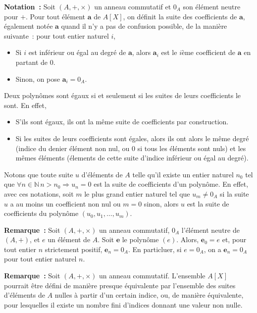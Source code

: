 \medskip

\noindent\textbf{Notation :} 
    Soit $(A, +, \times)$ un anneau commutatif et $0_A$ son élément neutre pour $+$.
    Pour tout élément $\mathbf{a}$ de $A[X]$, on définit la suite des coefficients de $\mathbf{a}$, également notée $\mathbf{a}$ quand il n'y a pas de confusion possible, de la manière suivante : pour tout entier naturel $i$, 
\begin{itemize}[nosep]
    \item Si $i$ est inférieur ou égal au degré de $\mathbf{a}$, alors $\mathbf{a}_i$ est le $i$ème coefficient de $\mathbf{a}$ en partant de $0$.
    \item Sinon, on pose $\mathbf{a}_i = 0_A$.
\end{itemize}
Deux polynômes sont égaux si et seulement si les suites de leurs coefficients le sont.
En effet, 
\begin{itemize}[nosep]
    \item S'ils sont égaux, ils ont la même suite de coefficients par construction.
    \item Si les suites de leurs coefficients sont égales, alors ils ont alors le même degré (indice du denier élément non nul, ou $0$ si tous les éléments sont nuls) et les mêmes éléments (élements de cette suite d'indice inférieur ou égal au degré).
\end{itemize}
Notons que toute suite $u$ d'éléments de $A$ telle qu'il existe un entier naturel $n_0$ tel que $\forall n \in \mathbb{N} \, n > n_0 \Rightarrow u_n = 0$ est la suite de coefficients d'un polynôme. 
En effet, avec ces notations, soit $m$ le plus grand entier naturel tel que $u_m \neq 0_A$ si la suite $u$ a au moins un coefficient non nul ou $m = 0$ sinon, alors $u$ est la suite de coefficients du polynôme $(u_0, u_1, \dots, u_m)$.

\medskip

\noindent\textbf{Remarque :} 
    Soit $(A, +, \times)$ un anneau commutatif, $0_A$ l'élément neutre de $(A, +)$, et $e$ un élément de $A$.
    Soit $\mathbf{e}$ le polynôme $(e)$.
    Alors, $\mathbf{e}_0 = e$ et, pour tout entier $n$ strictement positif, $\mathbf{e}_n = 0_A$.
    En particluer, si $e = 0_A$, on a $\mathbf{e}_n = 0_A$ pour tout entier naturel $n$.

\medskip

\noindent\textbf{Remarque :} 
    Soit $(A, +, \times)$ un anneau commutatif.
    L'ensemble $A[X]$ pourrait être défini de manière presque équivalente par l'ensemble des suites d'éléments de $A$ nulles à partir d'un certain indice, ou, de manière équivalente, pour lesquelles il existe un nombre fini d'indices donnant une valeur non nulle.

